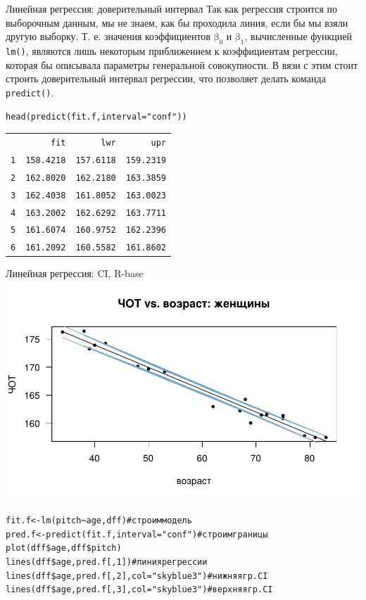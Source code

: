 \begin{frame}{Линейная регрессия: доверительный интервал}
Так как регрессия строится по выборочным данным, мы не знаем, как бы проходила линия, если бы мы взяли другую выборку. Т. е. значения коэффициентов $\mbox{β}_0$ и $\mbox{β}_1$, вычисленные функцией \scriptsize\verb"lm()"\normalsize, являются лишь некоторым приближением к коэффициентам регрессии, которая бы описывала параметры генеральной совокупности.
\vfill
В вязи с этим стоит строить доверительный интервал регрессии, что позволяет делать команда \scriptsize\verb"predict()"\normalsize.
\scriptsize
\begin{alltt}
head(\alert{predict(fit.f, interval = "conf")})\\
\begin{tabular}{rrrr}
 & fit & lwr& upr \\
1 & 158.4218 & 157.6118    & 159.2319 \\
2 & 162.8020 & 162.2180 & 163.3859 \\
3 & 162.4038 & 161.8052 & 163.0023 \\
4 & 163.2002 & 162.6292 & 163.7711 \\
5 & 161.6074 & 160.9752  & 162.2396 \\
6 & 161.2092 & 160.5582 & 161.8602 \\
\end{tabular}
\end{alltt}
\normalsize
\end{frame}
\begin{frame}{Линейная регрессия: CI, R-base}
\includegraphics[width=0.9\linewidth]{regressionci.pdf}
\scriptsize
\begin{alltt}
fit.f <- lm(pitch\textasciitilde  age, dff) \hfill \# строим модель\\
\alert{pred.f} <- \alert{predict(fit.f, interval = "conf")}\hfill \# строим границы\\
plot(dff\$age, dff\$pitch)\\
lines(dff\$age, \alert{pred.f[,1]})\hfill \# линия регрессии\\
lines(dff\$age, \alert{pred.f[,2]}, col = "skyblue3") \hfill \# нижняя гр. CI\\
lines(dff\$age, \alert{pred.f[,3]}, col = "skyblue3") \hfill \# верхняя гр. CI\\
~
\end{alltt}
\normalsize
\end{frame}
